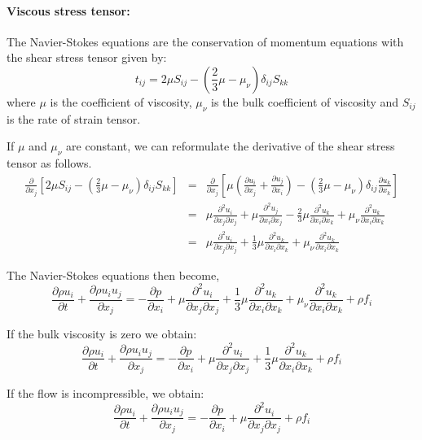 \documentclass[oneside,a4paper,11pt]{report}
\begin{document}
\paragraph{Viscous stress tensor:}
The Navier-Stokes equations are the conservation of momentum equations with the shear stress tensor given by:
\begin{equation}
\label{eq:viscous_stress_tensor}
t_{ij}=2\mu S_{ij}-\left(\frac{2}{3}\mu-\mu_{\nu}\right)\delta_{ij}S_{kk}
\end{equation}
where $\mu$ is the coefficient of viscosity, $\mu_{\nu}$ is the bulk coefficient of viscosity and $S_{ij}$ is the rate of strain tensor.

If $\mu$ and $\mu_{\nu}$ are constant, we can reformulate the derivative of the shear stress tensor as follows.
\begin{eqnarray*}
\frac{\partial}{\partial x_j}\left[2\mu S_{ij}-\left(\frac{2}{3}\mu-\mu_{\nu}\right)\delta_{ij}S_{kk}\right]&=&\frac{\partial}{\partial x_j}\left[\mu \left(\frac{\partial u_i}{\partial x_j}+\frac{\partial u_j}{\partial x_i}\right)-\left(\frac{2}{3}\mu-\mu_{\nu}\right)\delta_{ij}\frac{\partial u_k}{\partial x_k}\right]\\
&=&\mu\frac{\partial^2 u_i}{\partial x_j \partial x_j}+\mu\frac{\partial^2 u_j}{\partial x_i\partial x_j}-\frac{2}{3}\mu\frac{\partial^2 u_k}{\partial x_i \partial x_k}+\mu_{\nu}\frac{\partial^2 u_k}{\partial x_i \partial x_k}\\
&=&\mu\frac{\partial^2 u_i}{\partial x_j \partial x_j}+\frac{1}{3}\mu\frac{\partial^2 u_k}{\partial x_i \partial x_k}+\mu_{\nu}\frac{\partial^2 u_k}{\partial x_i \partial x_k}
\end{eqnarray*}

The Navier-Stokes equations then become,
\[\frac{\partial \rho u_i}{\partial t}+\frac{\partial \rho u_i u_j}{\partial x_j}=-\frac{\partial p}{\partial x_i} + \mu\frac{\partial^2 u_i}{\partial x_j \partial x_j}+\frac{1}{3}\mu\frac{\partial^2 u_k}{\partial x_i \partial x_k}+\mu_{\nu}\frac{\partial^2 u_k}{\partial x_i \partial x_k} +\rho f_i \] 

If the bulk viscosity is zero we obtain:
\[\frac{\partial \rho u_i}{\partial t}+\frac{\partial \rho u_i u_j}{\partial x_j} = -\frac{\partial p}{\partial x_i} + \mu\frac{\partial^2 u_i}{\partial x_j \partial x_j}+\frac{1}{3}\mu\frac{\partial^2 u_k}{\partial x_i \partial x_k} + \rho f_i\]
 
If the flow is incompressible, we obtain:
\[ \frac{\partial \rho u_i}{\partial t}+\frac{\partial \rho u_i u_j}{\partial x_j} = -\frac{\partial p}{\partial x_i} + \mu\frac{\partial^2 u_i}{\partial x_j \partial x_j} +\rho f_i \] 
\end{document}
